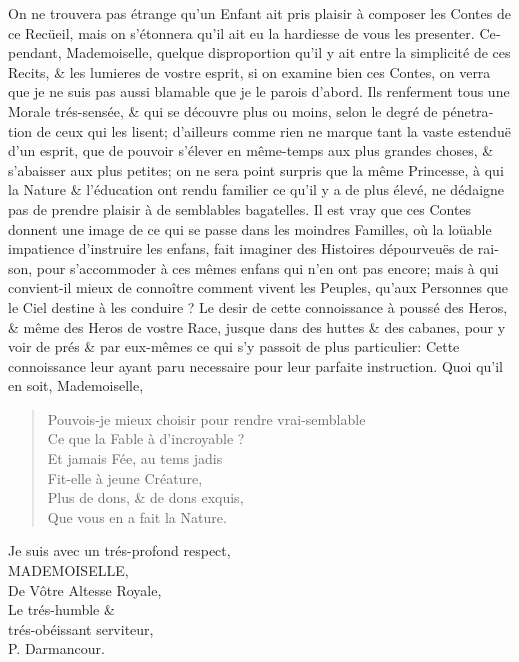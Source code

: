 \documentclass[14pt,a4paper]{memoir}
\begin{document}
\begin{otherlanguage}{french}
\begin{itshape}
On ne trouvera pas étrange qu'un Enfant ait pris plaisir à
composer les Contes de ce Recüeil, mais on s'étonnera qu'il ait
eu la hardiesse de vous les presenter. Cependant, Mademoiselle,
quelque disproportion qu'il y ait entre la simplicité de ces
Recits, \& les lumieres de vostre esprit, si on examine bien ces
Contes, on verra que je ne suis pas aussi blamable que je le
parois d'abord. Ils renferment tous une Morale trés-sensée,
\& qui se découvre plus ou moins, selon le degré de pénetration
de ceux qui les lisent; d'ailleurs comme rien ne marque tant
la vaste estenduë d'un esprit, que de pouvoir s'élever en
même-temps aux plus grandes choses, \& s'abaisser aux plus
petites; on ne sera point surpris que la même Princesse, à qui
la Nature \& l'éducation ont rendu familier ce qu'il y a de
plus élevé, ne dédaigne pas de prendre plaisir à de semblables
bagatelles. Il est vray que ces Contes donnent une image de ce
qui se passe dans les moindres Familles, où la loüable impatience
d'instruire les enfans, fait imaginer des Histoires dépourveuës
de raison, pour s'accommoder à ces mêmes enfans qui n'en ont
pas encore; mais à qui convient-il mieux de connoître comment
vivent les Peuples, qu'aux Personnes que le Ciel destine à
les conduire ? Le desir de cette connoissance à poussé des Heros,
\& même des Heros de vostre Race, jusque dans des huttes \& des
cabanes, pour y voir de prés \& par eux-mêmes ce qui s'y passoit
de plus particulier: Cette connoissance leur ayant paru necessaire
pour leur parfaite instruction. Quoi qu'il en soit, Mademoiselle,

\begin{verse}
Pouvois-je mieux choisir pour rendre vrai-semblable \\
Ce que la Fable à d'incroyable ? \\
Et jamais Fée, au tems jadis \\
Fit-elle à jeune Créature, \\
Plus de dons, \& de dons exquis, \\
Que vous en a fait la Nature.
\end{verse}

\begin{flushright}
Je suis avec un trés-profond respect, \\
MADEMOISELLE, \\
De Vôtre Altesse Royale, \\
Le trés-humble \& \\
trés-obéissant serviteur, \\
P. Darmancour.
\end{flushright}


\end{itshape}
\end{otherlanguage}
\end{document}
